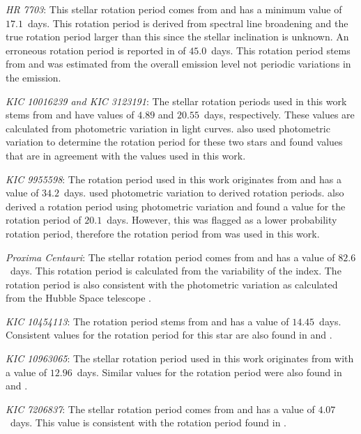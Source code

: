 \textit{HR 7703}: This stellar rotation period comes from \citet{Ammler_vonEiff_Reiners_2012} and has a minimum value of $17.1$~days. This rotation period is derived from spectral line broadening and the true rotation period larger than this since the stellar inclination is unknown. An erroneous rotation period is reported in \citet{Pizzolato_etal_2003} of $45.0$~days. This rotation period stems from \citet{Saar_etal_1997} and was estimated from the overall \caII emission level not periodic variations in the emission.

\textit{KIC 10016239 and KIC 3123191}: The stellar rotation periods used in this work stems from \citet{McQuillan_etal_2014} and have values of $4.89$ and $20.55$~days, respectively. These values are calculated from photometric variation in light curves. \citet{Garcia_etal_2014} also used photometric variation to determine the rotation period for these two stars and found values that are in agreement with the values used in this work.

\textit{KIC 9955598}: The rotation period used in this work originates from \citet{Garcia_etal_2014} and has a value of $34.2$~days. \citet{Garcia_etal_2014} used photometric variation to derived rotation periods. \citet{Paz_Chinchon_etal_2015} also derived a rotation period using photometric variation and found a value for the rotation period of $20.1$~days. However, this was flagged as a lower probability rotation period, therefore the rotation period from \citet{Garcia_etal_2014} was used in this work. 

\textit{Proxima Centauri}: The stellar rotation period comes from \citet{Collins_etal_2017} and has a value of $82.6$~days. This rotation period is calculated from the variability of the \Halpha index. The rotation period is also consistent with the photometric variation as calculated from the Hubble Space telescope \citep{Benedict_etal_1998}.

\textit{KIC 10454113}: The rotation period stems from \citet{McQuillan_etal_2014} and has a value of $14.45$~days. Consistent values for the rotation period for this star are also found in \citet{do_Nascimento_etal_2014} and \citet{Nielsen_etal_2013}.

\textit{KIC 10963065}: The stellar rotation period used in this work originates from \citet{Paz_Chinchon_etal_2015} with a value of $12.96$~days. Similar values for the rotation period were also found in \citet{McQuillan_etal_2013} and \citet{Mazeh_etal_2015}.

\textit{KIC 7206837}: The stellar rotation period comes from \citet{McQuillan_etal_2014} and has a value of $4.07$~days. This value is consistent with the rotation period found in \citet{Nielsen_etal_2013}.

